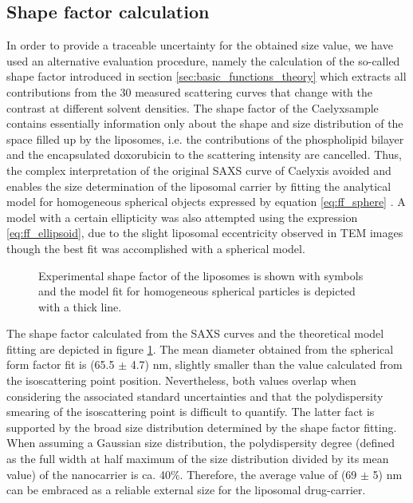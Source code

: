 \subsection{Shape factor calculation}
In order to provide a traceable uncertainty for the obtained size value, we have used an alternative evaluation procedure, namely the calculation of the so-called shape factor introduced in section \ref{sec:basic_functions_theory} which extracts all contributions from the 30 measured scattering curves that change with the contrast at different solvent densities. The shape factor of the Caelyx\textregistered sample contains essentially information only about the shape and size distribution of the space filled up by the liposomes, i.e. the contributions of the phospholipid bilayer and the encapsulated doxorubicin to the scattering intensity are cancelled. Thus, the complex interpretation of the original SAXS curve of Caelyx\textregistered is avoided and enables the size determination of the liposomal carrier by fitting the analytical model for homogeneous spherical objects expressed by equation \ref{eq:ff_sphere} . A model with a certain ellipticity was also attempted using the expression \ref{eq:ff_ellipsoid}, due to the slight liposomal eccentricity observed in TEM images \citep{barenholz_doxil_2012} though the best fit was accomplished with a spherical model. 

\begin{figure}
	\centering
		
		\caption[Experimental shape factor of Caelyx.]{Experimental shape factor of the liposomes is shown with symbols and the model fit for homogeneous spherical particles is depicted with a thick line.}
		\label{fig:CaelyxIodixanolResonantTerm}
\end{figure}

The shape factor calculated from the SAXS curves and the theoretical model fitting are depicted in figure \ref{fig:CaelyxIodixanolResonantTerm}. The mean diameter obtained from the spherical form factor fit is (65.5 $\pm$ 4.7) nm, slightly smaller than the value calculated from the isoscattering point position. Nevertheless, both values overlap when considering the associated standard uncertainties and that the polydispersity smearing of the isoscattering point is difficult to quantify. The latter fact is supported by the broad size distribution determined by the shape factor fitting. When assuming a Gaussian size distribution, the polydispersity degree (defined as the full width at half maximum of the size distribution divided by its mean value) of the nanocarrier is ca. 40$\%$. Therefore, the average value of (69 $\pm$ 5) nm can be embraced as a reliable external size for the liposomal drug-carrier.

